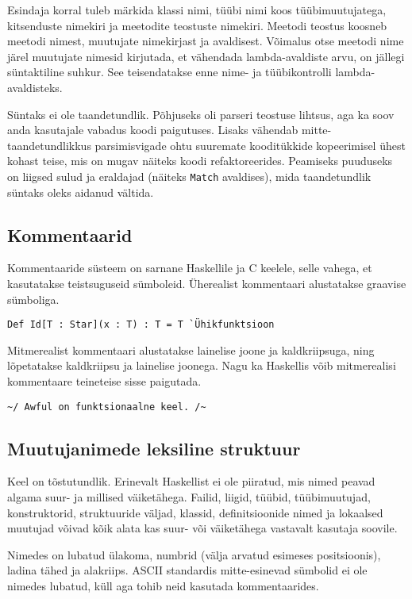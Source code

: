 \documentclass[12pt]{article}
\begin{document}
      Esindaja korral tuleb märkida klassi nimi, tüübi nimi koos tüübimuutujatega, kitsenduste nimekiri ja meetodite teostuste nimekiri. Meetodi teostus koosneb meetodi nimest, muutujate nimekirjast ja avaldisest. Võimalus otse meetodi nime järel muutujate nimesid kirjutada, et vähendada lambda-avaldiste arvu, on jällegi süntaktiline suhkur. See teisendatakse enne nime- ja tüübikontrolli lambda-avaldisteks.

      Süntaks ei ole taandetundlik. Põhjuseks oli parseri teostuse lihtsus, aga ka soov anda kasutajale vabadus koodi paigutuses. Lisaks vähendab mitte-taandetundlikkus parsimisvigade ohtu suuremate kooditükkide kopeerimisel ühest kohast teise, mis on mugav näiteks koodi refaktoreerides. Peamiseks puuduseks on liigsed sulud ja eraldajad (näiteks \verb!Match! avaldises), mida taandetundlik süntaks oleks aidanud vältida.
    \subsection{Kommentaarid}\label{kommentaarid}
      Kommentaaride süsteem on sarnane Haskellile ja C keelele, selle vahega, et kasutatakse teistsuguseid sümboleid. Üherealist kommentaari alustatakse graavise sümboliga.

      \begin{verbatim}Def Id[T : Star](x : T) : T = T `Ühikfunktsioon\end{verbatim}

      Mitmerealist kommentaari alustatakse lainelise joone ja kaldkriipsuga, ning lõpetatakse kaldkriipsu ja lainelise joonega. Nagu ka Haskellis võib mitmerealisi kommentaare teineteise sisse paigutada.

      \begin{verbatim}~/ Awful on funktsionaalne keel. /~\end{verbatim}
    \subsection{Muutujanimede leksiline struktuur}\label{muutujanimed}
      Keel on tõstutundlik. Erinevalt Haskellist ei ole piiratud, mis nimed peavad algama suur- ja millised väiketähega. Failid, liigid, tüübid, tüübimuutujad, konstruktorid, struktuuride väljad, klassid, definitsioonide nimed ja lokaalsed muutujad võivad kõik alata kas suur- või väiketähega vastavalt kasutaja soovile.

      Nimedes on lubatud ülakoma, numbrid (välja arvatud esimeses positsioonis), ladina tähed ja alakriips. ASCII standardis mitte-esinevad sümbolid ei ole nimedes lubatud, küll aga tohib neid kasutada kommentaarides.
\end{document}
